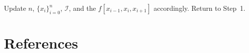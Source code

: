 \documentclass[review]{elsarticle}
\begin{document}
\begin{algo}
\begin{description}
Update $n$, $\{x_i\}_{i=0}^n$, $\mathcal{I}$, and the $f[x_{i-1}, x_{i}, x_{i+1}]$ accordingly.  Return to Step~1.

\end{description}
\end{algo}



\section*{References}


\end{document}

